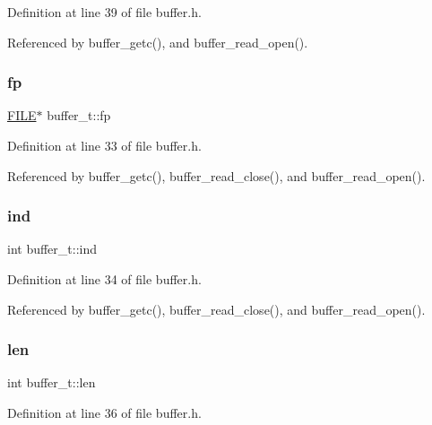 Definition at line 39 of file buffer.\+h.



Referenced by buffer\+\_\+getc(), and buffer\+\_\+read\+\_\+open().

\mbox{\label{structbuffer__t_a00a55014e0827223c41b1b1d56e5be5d}} 
\subsubsection{\texorpdfstring{fp}{fp}}
{\footnotesize\ttfamily \hyperlink{posix_8h_aed4dabeb9f7c518ded42f930a04abce8}{F\+I\+LE}$\ast$ buffer\+\_\+t\+::fp}



Definition at line 33 of file buffer.\+h.



Referenced by buffer\+\_\+getc(), buffer\+\_\+read\+\_\+close(), and buffer\+\_\+read\+\_\+open().

\mbox{\label{structbuffer__t_a59ea992e5006ead050862bae5c41670a}} 
\subsubsection{\texorpdfstring{ind}{ind}}
{\footnotesize\ttfamily int buffer\+\_\+t\+::ind}



Definition at line 34 of file buffer.\+h.



Referenced by buffer\+\_\+getc(), buffer\+\_\+read\+\_\+close(), and buffer\+\_\+read\+\_\+open().

\mbox{\label{structbuffer__t_a0b67fc6880d331ae05dab0e58a4584c2}} 
\subsubsection{\texorpdfstring{len}{len}}
{\footnotesize\ttfamily int buffer\+\_\+t\+::len}



Definition at line 36 of file buffer.\+h.



